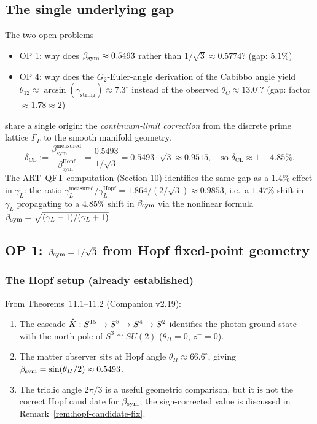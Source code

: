 \subsection{The single underlying gap}

\begin{remark}
The two open problems
\begin{itemize}
\item OP 1: why does $\beta_{\mathrm{sym}} \approx 0.5493$ rather than $1/\sqrt{3}
  \approx 0.5774$? (gap: $5.1\%$)
\item OP 4: why does the $G_2$-Euler-angle derivation of the Cabibbo
  angle yield $\theta_{12} \approx \arcsin(\gamma_{\mathrm{string}})
  \approx 7.3^\circ$ instead of the observed $\theta_C \approx 13.0^\circ$?
  (gap: factor $\approx 1.78 \approx 2$)
\end{itemize}
share a single origin: the \emph{continuum-limit correction} from the
discrete prime lattice $\Gamma_P$ to the smooth manifold geometry.
\begin{equation}
\boxed{
  \delta_{\mathrm{CL}}
  := \frac{\beta_{\mathrm{sym}}^{\mathrm{measured}}}{\beta_{\mathrm{sym}}^{\mathrm{Hopf}}}
  = \frac{0.5493}{1/\sqrt{3}}
  = 0.5493 \cdot \sqrt{3}
  \approx 0.9515,
  \quad
  \text{so } \delta_{\mathrm{CL}} \approx 1 - 4.85\%.
}
\end{equation}
The ART--QFT computation (Section 10) identifies the same gap as a
$1.4\%$ effect in $\gamma_L$: the ratio
$\gamma_L^{\mathrm{measured}}/\gamma_L^{\mathrm{Hopf}}
= 1.864 / (2/\sqrt{3}) \approx 0.9853$,
i.e.\ a $1.47\%$ shift in $\gamma_L$ propagating to a $4.85\%$ shift
in $\beta_{\mathrm{sym}}$ via the nonlinear formula
$\beta_{\mathrm{sym}} = \sqrt{(\gamma_L-1)/(\gamma_L+1)}$.
\end{remark}

\subsection{OP 1: \texorpdfstring{$\beta_{\mathrm{sym}} = 1/\sqrt{3}$}{β\_sym = 1/√3}
  from Hopf fixed-point geometry}
\label{sec:op1}

\subsubsection{The Hopf setup (already established)}

From Theorems~11.1--11.2 (Companion v2.19):
\begin{enumerate}
\item The cascade $\hat{K}: S^{15} \to S^8 \to S^4 \to S^2$ identifies
  the photon ground state with the north pole of $S^3 \cong SU(2)$
  ($\theta_H = 0$, $z^- = 0$).
\item The matter observer sits at Hopf angle $\theta_H \approx 66.6^\circ$,
  giving $\beta_{\mathrm{sym}} = \sin(\theta_H/2) \approx 0.5493$.
\item The triolic angle $2\pi/3$ is a useful geometric comparison, but it
  is not the correct Hopf candidate for $\beta_{\mathrm{sym}}$; the sign-corrected value
  is discussed in Remark~\ref{rem:hopf-candidate-fix}.
\end{enumerate}

